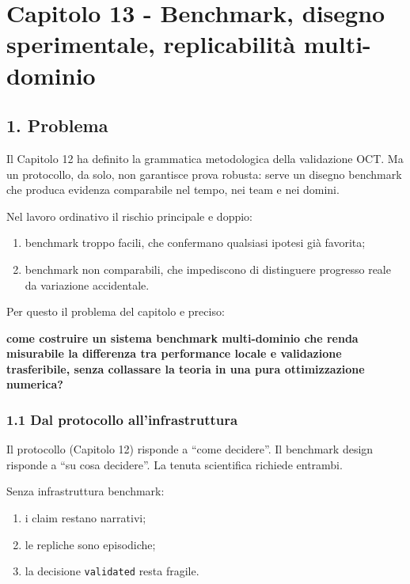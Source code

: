 \chapter{Capitolo 13 - Benchmark, disegno sperimentale, replicabilità multi-dominio}

\section{1. Problema}

Il Capitolo 12 ha definito la grammatica metodologica della validazione OCT. Ma un protocollo, da solo, non garantisce prova robusta: serve un disegno benchmark che produca evidenza comparabile nel tempo, nei team e nei domini.

Nel lavoro ordinativo il rischio principale e doppio:

\begin{enumerate}
\def\labelenumi{\arabic{enumi}.}
\tightlist
\item
  benchmark troppo facili, che confermano qualsiasi ipotesi già favorita;
\item
  benchmark non comparabili, che impediscono di distinguere progresso reale da variazione accidentale.
\end{enumerate}

Per questo il problema del capitolo e preciso:

\textbf{come costruire un sistema benchmark multi-dominio che renda misurabile la differenza tra performance locale e validazione trasferibile, senza collassare la teoria in una pura ottimizzazione numerica?}

\subsection{1.1 Dal protocollo all'infrastruttura}

Il protocollo (Capitolo 12) risponde a ``come decidere''. Il benchmark design risponde a ``su cosa decidere''. La tenuta scientifica richiede entrambi.

Senza infrastruttura benchmark:

\begin{enumerate}
\def\labelenumi{\arabic{enumi}.}
\tightlist
\item
  i claim restano narrativi;
\item
  le repliche sono episodiche;
\item
  la decisione \texttt{validated} resta fragile.
\end{enumerate}

